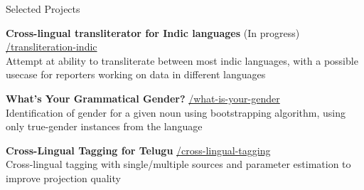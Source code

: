 
\begin{rSection}{\faFolderOpen \hspace{0.5mm} Selected Projects}

    {\textbf{Cross-lingual transliterator for Indic languages} (In progress)} \hfill {\href{https://github.com/Akshayanti/transliteration-indic}{\faGithub/transliteration-indic}}\\
        Attempt at ability to transliterate between most indic languages, with a possible usecase for reporters working on data in different languages

    {\textbf{What's Your Grammatical Gender?}} \hfill {\href{https://github.com/Akshayanti/what-is-your-gender}{\faGithub/what-is-your-gender}}\\
        Identification of gender for a given noun using bootstrapping algorithm, using only true-gender instances from the language

    {\textbf{Cross-Lingual Tagging for Telugu}} \hfill
    \href{https://github.com/Akshayanti/cross-lingual-tagging}{\faGithub/cross-lingual-tagging}\\
        Cross-lingual tagging with single/multiple sources and parameter estimation to improve projection quality

\end{rSection}